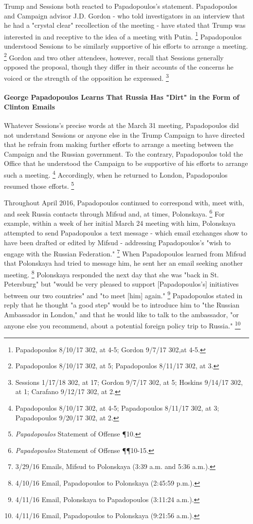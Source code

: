 Trump and Sessions both reacted to Papadopoulos's statement. Papadopoulos and Campaign advisor J.D. Gordon - who told investigators in an interview that he had a "crystal clear" recollection of the meeting - have stated that Trump was interested in and receptive to the idea of a meeting with Putin.%
\footnote{Papadopoulos 8/10/17 302, at 4-5; Gordon 9/7/17 302,at 4-5.}
Papadopoulos understood Sessions to be similarly supportive of his efforts to arrange a meeting.%
\footnote{Papadopoulos 8/10/17 302, at 5; Papadopoulos 8/11/17 302, at 3.}
Gordon and two other attendees, however, recall that Sessions generally opposed the proposal, though they differ in their accounts of the concerns he voiced or the strength of the opposition he expressed.%
\footnote{Sessions 1/17/18 302, at 17; Gordon 9/7/17 302, at 5; Hoskins 9/14/17 302, at 1; Carafano 9/12/17 302, at 2.}

\paragraph{George Papadopoulos Learns That Russia Has "Dirt" in the Form of Clinton Emails}

Whatever Sessions's precise words at the March 31 meeting, Papadopoulos did not understand Sessions or anyone else in the Trump Campaign to have directed that he refrain from making further efforts to arrange a meeting between the Campaign and the Russian government.
To the contrary, Papadopoulos told the Office that he understood the Campaign to be supportive of his efforts to arrange such a meeting.%
\footnote{Papadopoulos 8/10/17 302, at 4-5; Papadopoulos 8/11/17 302, at 3; Papadopoulos 9/20/17 302, at 2.}
Accordingly, when he returned to London, Papadopoulos resumed those efforts.%
\footnote{\textit{Papadopoulos} Statement of Offense \P 10.}

Throughout April 2016, Papadopoulos continued to correspond with, meet with, and seek Russia contacts through Mifsud and, at times, Polonskaya.%
\footnote{\textit{Papadopoulos} Statement of Offense \P\P 10-15.}
For example, within a week of her initial March 24 meeting with him, Polonskaya attempted to send Papadopoulos a text message - which email exchanges show to have been drafted or edited by Mifsud - addressing Papadopoulos's "wish to engage with the Russian Federation."%
\footnote{3/29/16 Emails, Mifsud to Polonskaya (3:39 a.m. and 5:36 a.m.).}
When Papadopoulos learned from Mifsud that Polonskaya had tried to message him, he sent her an email seeking another meeting.%
\footnote{4/10/16 Email, Papadopoulos to Polonskaya (2:45:59 p.m.).}
Polonskaya responded the next day that she was "back in St. Petersburg" but "would be very pleased to support [Papadopoulos's] initiatives between our two countries" and "to meet [him] again."%
\footnote{4/11/16 Email, Polonskaya to Papadopoulos (3:11:24 a.m.).}
Papadopoulos stated in reply that he thought "a good step" would be to introduce him to "the Russian Ambassador in London," and that he would like to talk to the ambassador, "or anyone else you recommend, about a potential foreign policy trip to Russia."%
\footnote{4/11/16 Email, Papadopoulos to Polonskaya (9:21:56 a.m.).}

